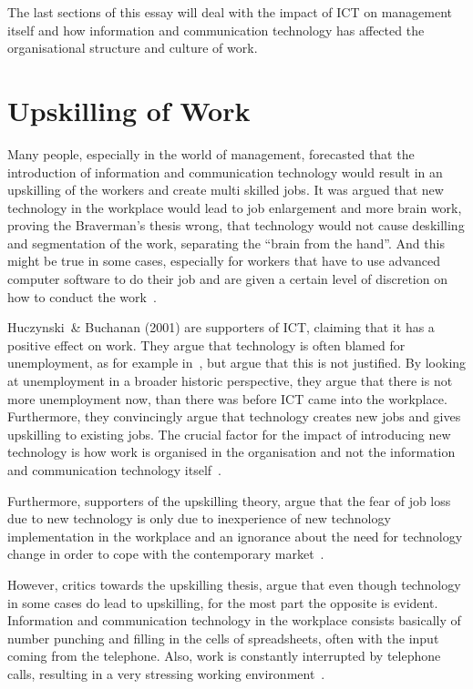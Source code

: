 \documentclass[a4paper,12pt,titlepage]{article}
\begin{document}
  The last sections of this essay will deal with the impact of
  ICT on management itself and how information and communication technology
  has affected the organisational structure and culture of work.

  \section{Upskilling of Work}
  Many people, especially in the world of management, forecasted that
  the introduction of information and communication technology would
  result in an upskilling of the workers and create multi skilled jobs. It was
  argued that new technology in the workplace would lead to
  job enlargement and more brain work, proving the Braverman's
  thesis wrong, that technology would not cause deskilling and 
  segmentation of the work, separating the ``brain from the hand''.
  And this might be true in
  some cases, especially for workers that have to use
  advanced computer software to do their job and are given
  a certain level of discretion on how to conduct the work~\cite[148]{jw}.

  Huczynski~\& Buchanan (2001) are supporters of ICT, claiming that it has a
  positive effect on work. They argue that technology is often blamed
  for unemployment, as for example in~, but argue that
  this is not justified. By looking at unemployment in a broader historic
  perspective, they argue that there is not more unemployment now, than there
  was before ICT came into the workplace. Furthermore, they convincingly argue 
  that technology creates new jobs and gives upskilling to existing
  jobs. The crucial factor for the impact of introducing new technology
  is how work is organised in the organisation and not the information
  and communication technology itself~\cite[70-73]{ahdb}.

  Furthermore, supporters of the upskilling theory, argue that the fear of
  job loss due to new technology is only due to inexperience
  of new technology implementation in the workplace and an ignorance
  about the need for technology change in order to cope with the
  contemporary market~\cite[30]{bl}.

  However, critics towards the upskilling thesis,
  argue that even though technology in some
  cases do lead to upskilling, for the most part
  the opposite is evident. Information and communication technology in the workplace consists
  basically of number punching and filling in the cells of spreadsheets, often
  with the input coming from the telephone. Also, work is
  constantly interrupted by telephone calls, resulting in a very stressing
  working environment~\cite[170]{bbt}.
\end{document}

